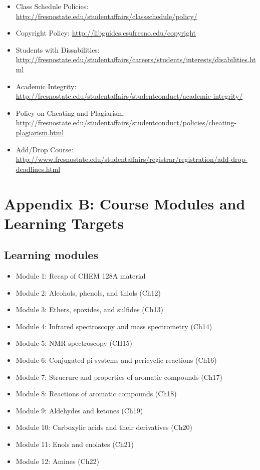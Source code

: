 \begin{itemize}
\tightlist
\item
  Class Schedule Policies:
  \url{http://fresnostate.edu/studentaffairs/classschedule/policy/}
\item
  Copyright Policy: \url{http://libguides.csufresno.edu/copyright}
\item
  Students with Dissabilities:
  \url{http://fresnostate.edu/studentaffairs/careers/students/interests/disabilities.html}
\item
  Academic Integrity:
  \url{http://fresnostate.edu/studentaffairs/studentconduct/academic-integrity/}
\item
  Policy on Cheating and Plagiarism:
  \url{http://fresnostate.edu/studentaffairs/studentconduct/policies/cheating-plagiarism.html}
\item
  Add/Drop Course:
  \href{http://fresnostate.edu/studentaffairs/classschedule/registration/add-drop.html}{http://www.fresnostate.edu/studentaffairs/registrar/registration/add-drop-deadlines.html}
\end{itemize}

\hypertarget{LT}{%
\section{Appendix B: Course Modules and Learning Targets}\label{LT}}

\hypertarget{learning-modules-1}{%
\subsection{Learning modules}\label{learning-modules-1}}

\begin{itemize}
\tightlist
\item
  Module 1: Recap of CHEM 128A material
\item
  Module 2: Alcohols, phenols, and thiols (Ch12)
\item
  Module 3: Ethers, epoxides, and sulfides (Ch13)
\item
  Module 4: Infrared spectroscopy and mass spectrometry (Ch14)
\item
  Module 5: NMR spectroscopy (CH15)
\item
  Module 6: Conjugated pi systems and pericyclic reactions (Ch16)
\item
  Module 7: Strucrure and properties of aromatic compounds (Ch17)
\item
  Module 8: Reactions of aromatic compounds (Ch18)
\item
  Module 9: Aldehydes and ketones (Ch19)
\item
  Module 10: Carboxylic acids and their derivatives (Ch20)
\item
  Module 11: Enols and enolates (Ch21)
\item
  Module 12: Amines (Ch22)
\end{itemize}

